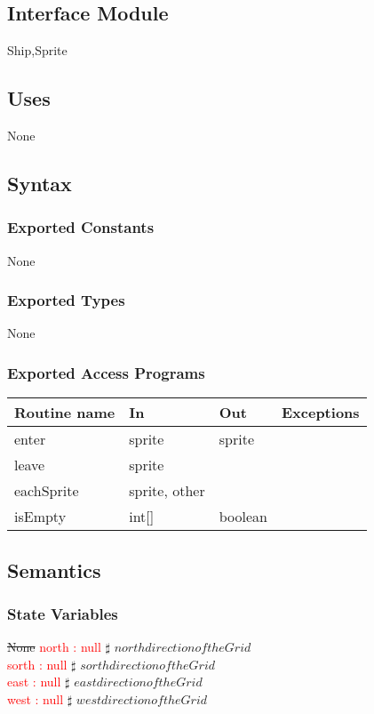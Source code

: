 \documentclass[12pt]{article}
\begin{document}
\subsection*{Interface Module}

Ship,Sprite

\subsection* {Uses}

None

\subsection* {Syntax}

\subsubsection* {Exported Constants}

None

\subsubsection* {Exported Types}

None 

\subsubsection* {Exported Access Programs}

\begin{tabular}{| l | l | l | p{5cm} |}
\hline
\textbf{Routine name} & \textbf{In} & \textbf{Out} & \textbf{Exceptions}\\
\hline
enter & sprite & sprite  & ~\\
\hline
leave & sprite & ~& ~ \\
\hline
eachSprite &sprite, other & ~  & ~\\
\hline
isEmpty & int[] & boolean & ~ \\
\hline
\end{tabular}

\subsection* {Semantics}

\subsubsection* {State Variables}
\sout{None}
\textcolor{red}{north : null}  $\sharp$ $north direction of the Grid $\\
\textcolor{red}{sorth : null} $\sharp$ $sorth direction of the Grid $\\
\textcolor{red}{east : null}  $\sharp$ $east direction of the Grid $\\
\textcolor{red}{west : null}  $\sharp$ $west direction of the Grid $\\
\end{document}

